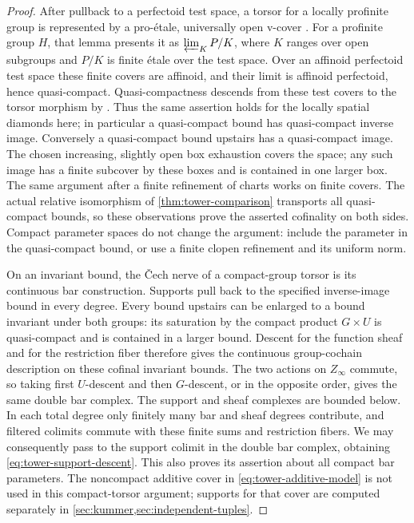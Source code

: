 \begin{proof}
After pullback to a perfectoid test space, a torsor for a locally
profinite group is represented by a pro-\'{e}tale, universally open
v-cover \cite[Lemma 10.13]{scholzeDiamonds2017}. For a profinite group
$H$, that lemma presents it as $\varprojlim_K P/K$, where $K$ ranges
over open subgroups and $P/K$ is finite \'{e}tale over the test space.
Over an affinoid perfectoid test space these finite covers are
affinoid, and their limit is affinoid perfectoid, hence quasi-compact.
Quasi-compactness descends from these test covers to the torsor
morphism by \cite[Proposition 10.11(o)]{scholzeDiamonds2017}.
Thus the same assertion holds for the locally spatial diamonds here;
in particular a quasi-compact bound has quasi-compact inverse image.
Conversely a quasi-compact bound upstairs has a quasi-compact
image. The chosen increasing, slightly open box exhaustion covers
the space; any such image has a finite subcover by these boxes and
is contained in one larger box. The same argument after a finite
refinement of charts works on finite covers. The actual relative
isomorphism of \cref{thm:tower-comparison} transports all
quasi-compact bounds, so these observations prove the asserted
cofinality on both sides. Compact parameter spaces do not change
the argument: include the parameter in the quasi-compact bound, or
use a finite clopen refinement and its uniform norm.

On an invariant bound, the \v{C}ech nerve of a compact-group torsor
is its continuous bar construction. Supports pull back to the
specified inverse-image bound in every degree. Every bound upstairs
can be enlarged to a bound invariant under both groups: its saturation
by the compact product $G\times U$ is quasi-compact and is contained
in a larger bound. Descent for the function sheaf and for the restriction fiber
therefore gives the continuous group-cochain description on these
cofinal invariant bounds. The two actions on $Z_\infty$ commute,
so taking first $U$-descent and then $G$-descent, or in the opposite
order, gives the same double bar complex. The support and sheaf
complexes are bounded below. In each total degree only finitely
many bar and sheaf degrees contribute, and filtered colimits commute
with these finite sums and restriction fibers. We may consequently
pass to the support colimit in the double bar complex, obtaining
\eqref{eq:tower-support-descent}. This also proves its assertion
about all compact bar parameters. The noncompact additive cover in
\eqref{eq:tower-additive-model} is not used in this compact-torsor
argument; supports for that cover are computed separately in
\cref{sec:kummer,sec:independent-tuples}.
\end{proof}
